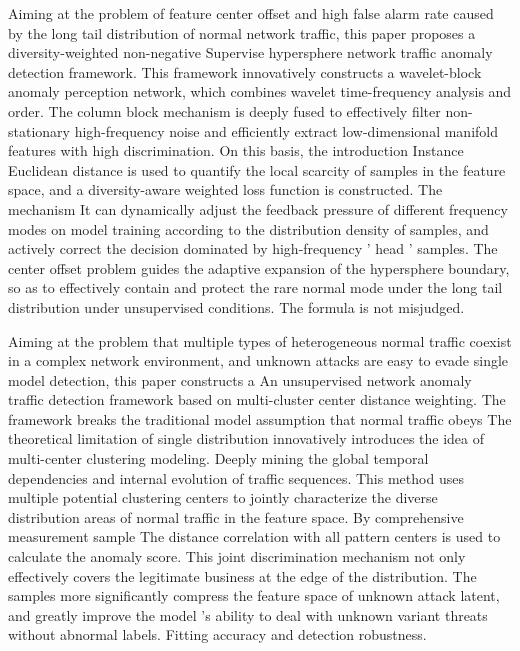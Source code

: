 \begin{eabstract}
    Aiming at the problem of feature center offset and high false alarm rate caused by the long tail distribution of normal network traffic, this paper proposes a diversity-weighted non-negative 
    Supervise hypersphere network traffic anomaly detection framework. This framework innovatively constructs a wavelet-block anomaly perception network, which combines wavelet time-frequency analysis and order. 
    The column block mechanism is deeply fused to effectively filter non-stationary high-frequency noise and efficiently extract low-dimensional manifold features with high discrimination. On this basis, the introduction 
    Instance Euclidean distance is used to quantify the local scarcity of samples in the feature space, and a diversity-aware weighted loss function is constructed. The mechanism 
    It can dynamically adjust the feedback pressure of different frequency modes on model training according to the distribution density of samples, and actively correct the decision dominated by high-frequency ' head ' samples. 
    The center offset problem guides the adaptive expansion of the hypersphere boundary, so as to effectively contain and protect the rare normal mode under the long tail distribution under unsupervised conditions. 
    The formula is not misjudged.

    Aiming at the problem that multiple types of heterogeneous normal traffic coexist in a complex network environment, and unknown attacks are easy to evade single model detection, this paper constructs a 
    An unsupervised network anomaly traffic detection framework based on multi-cluster center distance weighting. The framework breaks the traditional model assumption that normal traffic obeys 
    The theoretical limitation of single distribution innovatively introduces the idea of multi-center clustering modeling. Deeply mining the global temporal dependencies and internal evolution of traffic sequences. 
    This method uses multiple potential clustering centers to jointly characterize the diverse distribution areas of normal traffic in the feature space. By comprehensive measurement sample 
    The distance correlation with all pattern centers is used to calculate the anomaly score. This joint discrimination mechanism not only effectively covers the legitimate business at the edge of the distribution. 
    The  samples more significantly compress the feature space of unknown attack latent, and greatly improve the model 's ability to deal with unknown variant threats without abnormal labels. 
    Fitting accuracy and detection robustness.


\end{eabstract}
